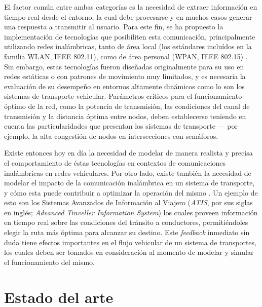 El factor común entre ambas categorías es la necesidad de extraer información en tiempo real desde el entorno, la cual debe procesarse y en muchos casos generar una respuesta a transmitir al usuario. Para este fin, se ha propuesto la implementación de tecnologías que posibiliten esta comunicación, principalmente utilizando redes inalámbricas, tanto de área local (los estándares incluídos en la familia WLAN, IEEE 802.11), como de área personal (WPAN, IEEE 802.15) \cite{80211dailey,80215vanet,80211wave}. Sin embargo, estas tecnologías fueron diseñadas originalmente para su uso en redes estáticas o con patrones de movimiento muy limitados, y es necesaria la evaluación de su desempeño en entornos altamente dinámicos como lo son los sistemas de transporte vehicular. Parámetros críticos para el funcionamiento óptimo de la red, como la potencia de transmisión, las condiciones del canal de transmisión y la distancia óptima entre nodos, deben establecerse teniendo en cuenta las particularidades que presentan los sistemas de transporte --- por ejemplo, la alta congestión de nodos en intersecciones con semáforos.

Existe entonces hoy en día la necesidad de modelar de manera realista y precisa el comportamiento de éstas tecnologías en contextos de comunicaciones inalámbricas en redes vehiculares. Por otro lado, existe también la necesidad de modelar el impacto de la comunicación inalámbrica en un sistema de transporte, y cómo esta puede contribuir a optimizar la operación del mismo \cite{bidirectionalsimul}. Un ejemplo de esto son los Sistemas Avanzados de Información al Viajero (\textit{ATIS}, por sus siglas en inglés; \textit{Advanced Traveller Information System}) los cuales proveen información en tiempo real sobre las condiciones del tránsito a conductores, permitiéndoles elegir la ruta más óptima para alcanzar su destino. Este \textit{feedback} inmediato sin duda tiene efectos importantes en el flujo vehicular de un sistema de transportes, los cuales deben ser tomados en consideración al momento de modelar y simular el funcionamiento del mismo.


\section{Estado del arte}\label{sec:state_of_the_art}

